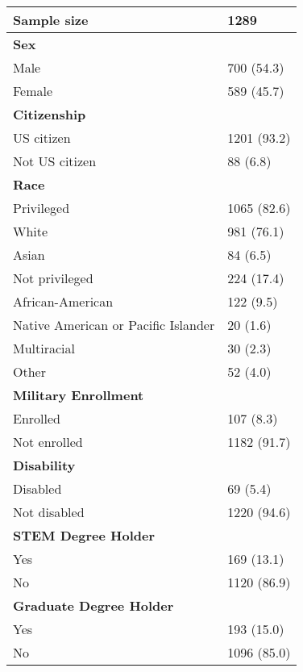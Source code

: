 \documentclass{article}
\newcommand*\pct{\scalebox{.85}{\%}}
\begin{document}
\begin{table}
\centering
\begin{tabu}{X[l]X[r]}
    \toprule
    \textbf{Sample size} & 1289 \\
    
    \midrule
    
    \textbf{Sex} & \\
    \qquad Male & 700 (54.3\pct) \\
    \qquad Female & 589 (45.7\pct) \\
    
    \textbf{Citizenship} & \\
    \qquad US citizen & 1201 (93.2\pct) \\
    \qquad Not US citizen & 88 (6.8\pct) \\
    
    \textbf{Race} & \\
    \qquad Privileged & 1065 (82.6\pct) \\
    \qquad \qquad White & 981 (76.1\pct) \\
    \qquad \qquad Asian & 84 (6.5\pct) \\
    \qquad Not privileged & 224 (17.4\pct) \\
    \qquad \qquad African-American & 122 (9.5\pct) \\
    \qquad \qquad Native American or Pacific Islander & 20 (1.6\pct) \\
    \qquad \qquad Multiracial & 30 (2.3\pct) \\
    \qquad \qquad Other & 52 (4.0\pct) \\
    
    \textbf{Military Enrollment} & \\
    \qquad Enrolled & 107 (8.3\pct) \\
    \qquad Not enrolled & 1182 (91.7\pct) \\
    
    \textbf{Disability} & \\
    \qquad Disabled & 69 (5.4\pct) \\
    \qquad Not disabled & 1220 (94.6\pct) \\
    
    \textbf{STEM Degree Holder} & \\
    \qquad Yes & 169 (13.1\pct) \\
    \qquad No & 1120 (86.9\pct) \\
    
    \textbf{Graduate Degree Holder} & \\
    \qquad Yes & 193 (15.0\pct) \\
    \qquad No & 1096 (85.0\pct) \\
    

\end{tabu}
\end{table}
\end{document}

